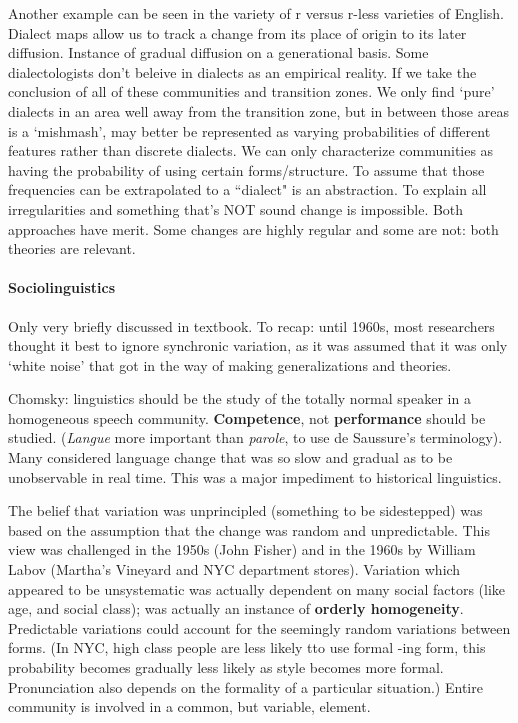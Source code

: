 \documentclass{exam}
\begin{document}
Another example can be seen in the variety of r versus r-less varieties of English. Dialect maps allow us to track a change from its place of origin to its later diffusion. Instance of gradual diffusion on a generational basis. Some dialectologists don't beleive in dialects as an empirical reality. If we take the conclusion of all of these communities and transition zones. We only find `pure' dialects in an area well away from the transition zone, but in between those areas is a `mishmash', may better be represented as varying probabilities of different features rather than discrete dialects. We can only characterize communities as having the probability of using certain forms/structure. To assume that those frequencies can be extrapolated to a ``dialect" is an abstraction. To explain all irregularities and something that's NOT sound change is impossible. Both approaches have merit. Some changes are highly regular and some are not: both theories are relevant. 

\paragraph*{Sociolinguistics} Only very briefly discussed in textbook. To recap: until 1960s, most researchers thought it best to ignore synchronic variation, as it was assumed that it was only `white noise' that got in the way of making generalizations and theories. 

Chomsky: linguistics should be the study of the totally normal speaker in a homogeneous speech community. \textbf{Competence}, not \textbf{performance} should be studied. (\textit{Langue} more important than \textit{parole}, to use de Saussure's terminology). Many considered language change that was so slow and gradual as to be unobservable in real time. This was a major impediment to historical linguistics. 

The belief that variation was unprincipled (something to be sidestepped) was based on the assumption that the change was random and unpredictable. This view was challenged in the 1950s (John Fisher) and in the 1960s by William Labov (Martha's Vineyard and NYC department stores). Variation which appeared to be unsystematic was actually dependent on many social factors (like age, and social class); was actually an instance of \textbf{orderly homogeneity}. Predictable variations could account for the seemingly random variations between forms. (In NYC, high class people are less likely tto use formal -ing form, this probability becomes gradually less likely as style becomes more formal. Pronunciation also depends on the formality of a particular situation.) Entire community is involved in a common, but variable, element. 
\end{document}
